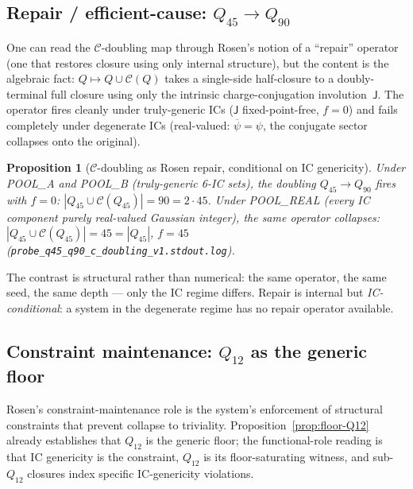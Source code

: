 \documentclass[12pt,a4paper]{article}
\newtheorem{proposition}[theorem]{Proposition}
\theoremstyle{definition}
\theoremstyle{remark}
\newcommand{\Ccls}{\mathcal{C}}             %
\newcommand{\Jconj}{\mathsf{J}}             %
\begin{document}
\subsection{Repair / efficient-cause: $Q_{45} \to Q_{90}$}\label{sec:fr-repair}

One can read the $\Ccls$-doubling map through Rosen's notion of a
``repair'' operator (one that restores closure using only internal
structure), but the content is the algebraic fact: $Q \mapsto Q \cup
\Ccls(Q)$ takes a single-side half-closure to a doubly-terminal full
closure using only the intrinsic charge-conjugation involution~$\Jconj$. The operator fires
cleanly under truly-generic ICs ($\Jconj$ fixed-point-free, $f=0$) and
fails completely under degenerate ICs (real-valued: $\overline{\psi} =
\psi$, the conjugate sector collapses onto the original).

\begin{proposition}[$\Ccls$-doubling as Rosen repair, conditional on
IC genericity]\label{prop:repair-conditional}
Under POOL\_A and POOL\_B (truly-generic 6-IC sets), the doubling
$Q_{45} \to Q_{90}$ fires with $f = 0$: $|Q_{45} \cup \Ccls(Q_{45})|
= 90 = 2 \cdot 45$. Under POOL\_REAL (every IC component purely
real-valued Gaussian integer), the same operator collapses:
$|Q_{45} \cup \Ccls(Q_{45})| = 45 = |Q_{45}|$, $f = 45$
(\texttt{probe\_q45\_q90\_c\_doubling\_v1.stdout.log}).
\end{proposition}

The contrast is structural rather than numerical: the same operator,
the same seed, the same depth --- only the IC regime differs. Repair
is internal but \emph{IC-conditional}: a system in the degenerate
regime has no repair operator available.

\subsection{Constraint maintenance: $Q_{12}$ as the generic floor}\label{sec:fr-constraint}

Rosen's constraint-maintenance role is the system's enforcement of
structural constraints that prevent collapse to triviality.
Proposition~\ref{prop:floor-Q12} already establishes that $Q_{12}$ is
the generic floor; the functional-role reading is that IC genericity
is the constraint, $Q_{12}$ is its floor-saturating witness, and
sub-$Q_{12}$ closures index specific IC-genericity violations.
\end{document}
